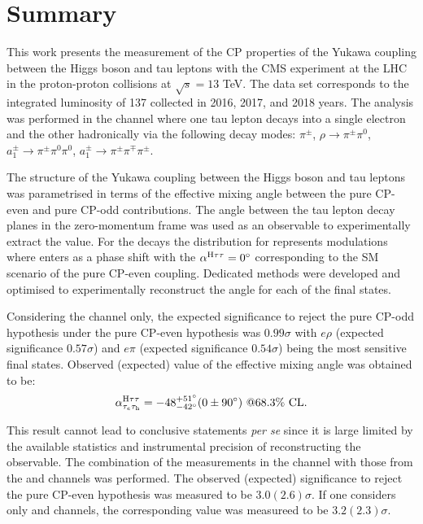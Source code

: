 \chapter{Summary}\label{sec:outro}

This work presents the measurement of the CP properties of the Yukawa coupling between the Higgs boson and tau leptons with the CMS experiment at the LHC in the proton-proton collisions at $\sqrt{s} = 13$ TeV. The data set corresponds to the integrated luminosity of 137 \ifb collected in 2016, 2017, and 2018 years. The analysis was performed in the \et channel where one tau lepton decays into a single electron and the other hadronically via the following decay modes: $\pi^\pm$, $\rho \to \pi^\pm \pi^0$, $a_1^\pm \to \pi^\pm\pi^0\pi^0$, $a_1^\pm \to \pi^\pm \pi^\mp \pi^\pm$. 

The structure of the Yukawa coupling between the Higgs boson and tau leptons was parametrised in terms of the effective mixing angle \mixa between the pure CP-even and pure CP-odd contributions. The angle between the tau lepton decay planes in the zero-momentum frame \phicp was used as an observable to experimentally extract the \mixa value. For the \htt decays the distribution for \phicp represents modulations where \mixa enters as a phase shift with the $\alpha^{\text{H}\tau\tau}=0^\circ$ corresponding to the SM scenario of the pure CP-even coupling. Dedicated methods were developed and optimised to experimentally reconstruct the \phicp angle for each of the final states.  

Considering the \et channel only, the expected significance to reject the pure CP-odd hypothesis under the pure CP-even hypothesis was $0.99\sigma$ with $e\rho$ (expected significance $0.57\sigma$) and $e\pi$ (expected significance $0.54\sigma$) being the most sensitive final states. Observed (expected) value of the effective mixing angle was obtained to be:
\begin{equation}
    \alpha^{\text{H}\tau\tau}_{\tau_e\tau_\mathrm{h}} = -48^{+51^\circ}_{-42^\circ}(0 \pm 90^\circ) ~@68.3\% \text{ CL}.
\end{equation}

This result cannot lead to conclusive statements \textit{per se} since it is large limited by the available statistics and instrumental precision of reconstructing the \phicp observable. The combination of the measurements in the \et channel with those from the \mt and \tata channels was performed. The observed (expected) significance to reject the pure CP-even hypothesis was measured to be $3.0 (2.6)\sigma$. If one considers only \mt and \tata channels, the corresponding value was measureed to be $3.2 (2.3)\sigma$. 

